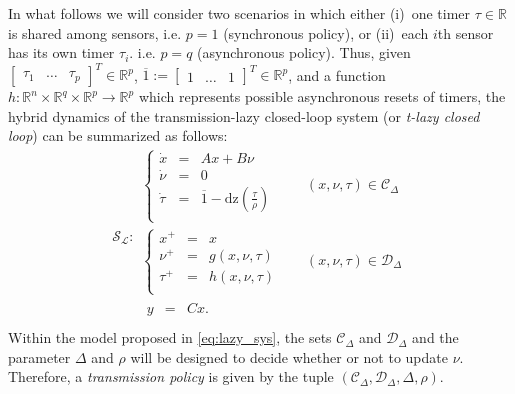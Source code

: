 \documentclass[twocolumn]{autart}
\newcommand{\realn}{\real^n}
\newcommand\real{\ensuremath{{\mathbb R}}}
\newcommand{\smallmat}[1]{\left[ \begin{smallmatrix}#1
    \end{smallmatrix} \right]}
\newcommand\dz{\mathrm{dz}}
\begin{document}
In what follows we will consider two scenarios in which 
either (i)~one timer $\tau\in\real$ is shared among sensors, 
i.e. $p=1$ (synchronous policy), or 
(ii)~each $i$th sensor has its own timer $\tau_i$.
i.e. $p=q$ (asynchronous policy). Thus, given 
$\smallmat{\tau_1 & \dots & \tau_p}^T\in\real^p$, 
$\overline{1} := \smallmat{1 & \dots & 1}^T\in\real^p$,
and a function $h:\realn\times\real^q\times\real^p\to\real^p$
which represents possible asynchronous resets of timers, 
the hybrid dynamics of the transmission-lazy closed-loop system
(or {\em t-lazy closed loop}) can be summarized as follows: 
\begin{equation}
\label{eq:lazy_sys}
 \mathcal{S}_\mathcal{L}:
  \begin{array}{ll} 
	\left\{ \begin{array}{lll}
		\dot{x} &=& Ax + B \nu  \\
		\dot{\nu} &=& 0 \\
		\dot{\tau} &=& \overline{1}-\dz(\frac{\tau}{\rho} ) \\
	 \end{array}\right. & 
	\quad(x,\nu,\tau)\in \mathcal{C}_\Delta \\
	\left\{\begin{array}{lll}
		x^+ &=& x  \\
		\nu^+ &=& g(x,\nu,\tau) \\
		\tau^+ &=& h(x,\nu,\tau) \\
	\end{array} \right. & 
        \quad(x,\nu,\tau)\in \mathcal{D}_\Delta \\
	 \begin{array}{lll}
		y &=& Cx.  \\
	 \end{array} 
 \end{array}
\end{equation}
Within the model proposed in \eqref{eq:lazy_sys},
the sets $\mathcal{C}_\Delta$ and $\mathcal{D}_\Delta$ 
and the parameter $\Delta$ and $\rho$
will be designed to decide whether or not to update $\nu$. Therefore,
a \emph{transmission policy} is given by the tuple
$(\mathcal{C}_\Delta,\mathcal{D}_\Delta,\Delta,\rho)$.
\end{document}
